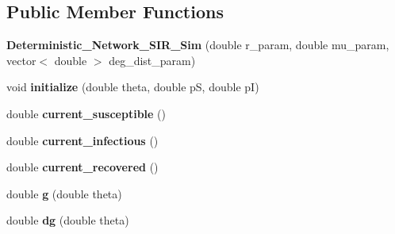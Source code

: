 \subsection*{Public Member Functions}
\begin{DoxyCompactItemize}
\item 
\hypertarget{classstudy_1_1_deterministic___network___s_i_r___sim_a80637dfbaf2d6254925a209b64a4eb37}{{\bfseries Deterministic\+\_\+\+Network\+\_\+\+S\+I\+R\+\_\+\+Sim} (double r\+\_\+param, double mu\+\_\+param, vector$<$ double $>$ deg\+\_\+dist\+\_\+param)}\label{classstudy_1_1_deterministic___network___s_i_r___sim_a80637dfbaf2d6254925a209b64a4eb37}

\item 
\hypertarget{classstudy_1_1_deterministic___network___s_i_r___sim_a24d7caffcf28dc2a7bf62747adc070e1}{void {\bfseries initialize} (double theta, double p\+S, double p\+I)}\label{classstudy_1_1_deterministic___network___s_i_r___sim_a24d7caffcf28dc2a7bf62747adc070e1}

\item 
\hypertarget{classstudy_1_1_deterministic___network___s_i_r___sim_ac801508ab47f6d67f49fd66f4aafa02e}{double {\bfseries current\+\_\+susceptible} ()}\label{classstudy_1_1_deterministic___network___s_i_r___sim_ac801508ab47f6d67f49fd66f4aafa02e}

\item 
\hypertarget{classstudy_1_1_deterministic___network___s_i_r___sim_a43be3a3c9dc56708fe78b764d4f8e3c9}{double {\bfseries current\+\_\+infectious} ()}\label{classstudy_1_1_deterministic___network___s_i_r___sim_a43be3a3c9dc56708fe78b764d4f8e3c9}

\item 
\hypertarget{classstudy_1_1_deterministic___network___s_i_r___sim_ad997545ee28391361b974f466404f231}{double {\bfseries current\+\_\+recovered} ()}\label{classstudy_1_1_deterministic___network___s_i_r___sim_ad997545ee28391361b974f466404f231}

\item 
\hypertarget{classstudy_1_1_deterministic___network___s_i_r___sim_a310fed69c52da3a2dfe29c093260d4d6}{double {\bfseries g} (double theta)}\label{classstudy_1_1_deterministic___network___s_i_r___sim_a310fed69c52da3a2dfe29c093260d4d6}

\item 
\hypertarget{classstudy_1_1_deterministic___network___s_i_r___sim_aecee36dc11c16a72775f819f4a7302c7}{double {\bfseries dg} (double theta)}\label{classstudy_1_1_deterministic___network___s_i_r___sim_aecee36dc11c16a72775f819f4a7302c7}


\end{DoxyCompactItemize}
